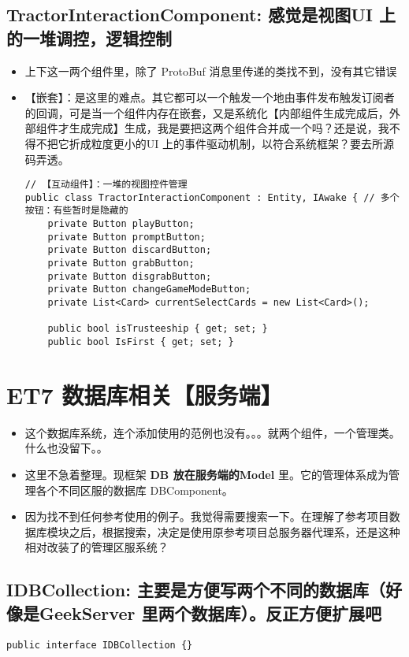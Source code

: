 \documentclass[9pt, b5paper]{article}
\begin{document}
\subsection{TractorInteractionComponent: 感觉是视图UI 上的一堆调控，逻辑控制}
\label{sec-4-8}
\begin{itemize}
\item 上下这一两个组件里，除了 ProtoBuf 消息里传递的类找不到，没有其它错误
\item 【嵌套】：是这里的难点。其它都可以一个触发一个地由事件发布触发订阅者的回调，可是当一个组件内存在嵌套，又是系统化【内部组件生成完成后，外部组件才生成完成】生成，我是要把这两个组件合并成一个吗？还是说，我不得不把它折成粒度更小的UI 上的事件驱动机制，以符合系统框架？要去所源码弄透。
\begin{verbatim}
// 【互动组件】：一堆的视图控件管理 
public class TractorInteractionComponent : Entity, IAwake { // 多个按钮：有些暂时是隐藏的
    private Button playButton;
    private Button promptButton;
    private Button discardButton;
    private Button grabButton;
    private Button disgrabButton;
    private Button changeGameModeButton;
    private List<Card> currentSelectCards = new List<Card>();

    public bool isTrusteeship { get; set; }
    public bool IsFirst { get; set; }
\end{verbatim}
\end{itemize}








\section{ET7 数据库相关【服务端】}
\label{sec-5}
\begin{itemize}
\item 这个数据库系统，连个添加使用的范例也没有。。。就两个组件，一个管理类。什么也没留下。。
\item 这里不急着整理。现框架 \textbf{DB 放在服务端的Model} 里。它的管理体系成为管理各个不同区服的数据库 DBComponent。
\item 因为找不到任何参考使用的例子。我觉得需要搜索一下。在理解了参考项目数据库模块之后，根据搜索，决定是使用原参考项目总服务器代理系，还是这种相对改装了的管理区服系统？
\end{itemize}
\subsection{IDBCollection: 主要是方便写两个不同的数据库（好像是GeekServer 里两个数据库）。反正方便扩展吧}
\label{sec-5-1}
\begin{verbatim}
public interface IDBCollection {}
\end{verbatim}
\end{document}
